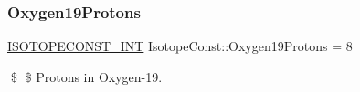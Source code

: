 \subsubsection{\texorpdfstring{Oxygen19\+Protons}{Oxygen19Protons}}
{\footnotesize\ttfamily \mbox{\hyperlink{group___isotope_const-_macros_ga5f18360b3e99483a35c32d789e62621c}{I\+S\+O\+T\+O\+P\+E\+C\+O\+N\+S\+T\+\_\+\+I\+NT}} Isotope\+Const\+::\+Oxygen19\+Protons = 8}

\$ \$ Protons in Oxygen-\/19. 